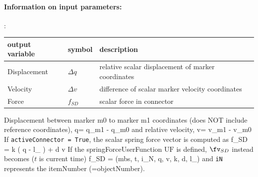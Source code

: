 \paragraph{Information on input parameters:} 
\finishTable

:
\begin{center}
\footnotesize
\begin{longtable}{| p{5cm} | p{5cm} | p{6cm} |} 
\hline
\bf output variable & \bf symbol & \bf description \\ \hline
Displacement & $\Delta q$ & relative scalar displacement of marker coordinates\\ \hline
Velocity & $\Delta v$ & difference of scalar marker velocity coordinates\\ \hline
Force & $f_{SD}$ & scalar force in connector\\ \hline
\end{longtable}
\end{center}
 \noindent
    \finishTable
    Displacement between marker m0 to marker m1 coordinates (does NOT include reference coordinates),
    \be
      \Delta q= q_{m1} - q_{m0}
    \ee
    and relative velocity,
    \be
      \Delta v= v_{m1} - v_{m0}
    \ee
    If \texttt{activeConnector = True}, the scalar spring force vector is computed as
    \be
      f_{SD} = k \left( \Delta q - l_ \right) + d \cdot \Delta v %
    \ee
    If the springForceUserFunction $\mathrm{UF}$ is defined, $\fv_{SD}$ instead becomes ($t$ is current time)
    \be
      f_{SD} = (mbs, t, i_N, \Delta q, \Delta v, k, d, l_)%
    \ee
    and \texttt{iN} represents the itemNumber (=objectNumber).

